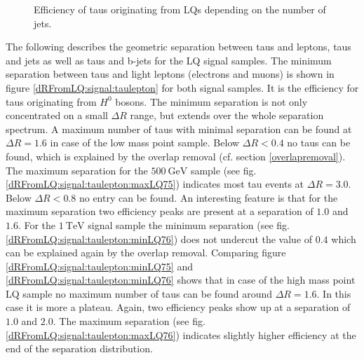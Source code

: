 \begin{figure}
\begin{subfigure}[t]{0.49\textwidth}
                \label{DividedFromLQ:signal:njetsLQ76}
                \end{subfigure}
\caption[Efficiency of taus originating from LQs depending on the number of jets.]{Efficiency of taus originating from LQs depending on the number of jets.}
\label{Divided:fromLQ:njets}
\end{figure}
%
The following describes the geometric separation between taus and leptons, taus and jets as well as taus and b-jets for the LQ signal samples.\newline
The minimum separation between taus and light leptons (electrons and muons) is shown in figure \ref{dRFromLQ:signal:taulepton} for both signal samples. It is the efficiency for taus originating from $H^0$ bosons. The minimum separation is not only concentrated on a small $\Delta R$ range, but extends over the whole separation spectrum. A maximum number of taus with minimal separation can be found at $\Delta R=1.6$ in case of the low mass point sample. Below $\Delta R<0.4$ no taus can be found, which is explained by the overlap removal (cf. section \ref{overlapremoval}). The maximum separation for the $\SI{500}{\giga\electronvolt}$ sample (see fig. \ref{dRFromLQ:signal:taulepton:maxLQ75}) indicates most tau events at $\Delta R=3.0$. Below $\Delta R<0.8$ no entry can be found. An interesting feature is that for the maximum separation two efficiency peaks are present at a separation of $1.0$ and $1.6$. For the $\SI{1}{\tera\electronvolt}$ signal sample the minimum separation (see fig. \ref{dRFromLQ:signal:taulepton:minLQ76}) does not undercut the value of $0.4$ which can be explained again by the overlap removal. Comparing figure \ref{dRFromLQ:signal:taulepton:minLQ75} and \ref{dRFromLQ:signal:taulepton:minLQ76} shows that in case of the high mass point LQ sample no maximum number of taus can be found around $\Delta R=1.6$. In this case it is more a plateau. Again, two efficiency peaks show up at a separation of $1.0$ and $2.0$. The maximum separation (see fig. \ref{dRFromLQ:signal:taulepton:maxLQ76}) indicates slightly higher efficiency at the end of the separation distribution.\newline     
%
